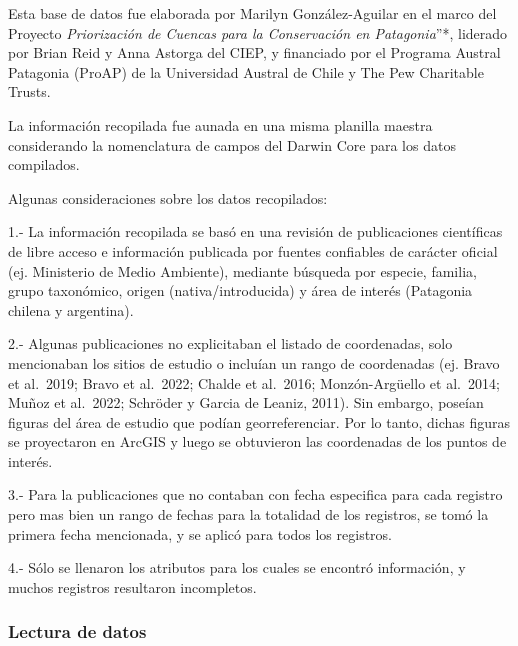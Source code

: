 \documentclass[sn-apa,pdflatex]{sn-jnl}
\begin{document}
Esta base de datos fue elaborada por Marilyn González-Aguilar en el
marco del Proyecto \emph{Priorización de Cuencas para la Conservación en
Patagonia}''*, liderado por Brian Reid y Anna Astorga del CIEP, y
financiado por el Programa Austral Patagonia (ProAP) de la Universidad
Austral de Chile y The Pew Charitable Trusts.

La información recopilada fue aunada en una misma planilla maestra
considerando la nomenclatura de campos del Darwin Core para los datos
compilados.

Algunas consideraciones sobre los datos recopilados:

1.- La información recopilada se basó en una revisión de publicaciones
científicas de libre acceso e información publicada por fuentes
confiables de carácter oficial (ej. Ministerio de Medio Ambiente),
mediante búsqueda por especie, familia, grupo taxonómico, origen
(nativa/introducida) y área de interés (Patagonia chilena y argentina).

2.- Algunas publicaciones no explicitaban el listado de coordenadas,
solo mencionaban los sitios de estudio o incluían un rango de
coordenadas (ej. Bravo et al.~2019; Bravo et al.~2022; Chalde et
al.~2016; Monzón-Argüello et al.~2014; Muñoz et al.~2022; Schröder y
Garcia de Leaniz, 2011). Sin embargo, poseían figuras del área de
estudio que podían georreferenciar. Por lo tanto, dichas figuras se
proyectaron en ArcGIS y luego se obtuvieron las coordenadas de los
puntos de interés.

3.- Para la publicaciones que no contaban con fecha especifica para cada
registro pero mas bien un rango de fechas para la totalidad de los
registros, se tomó la primera fecha mencionada, y se aplicó para todos
los registros.

4.- Sólo se llenaron los atributos para los cuales se encontró
información, y muchos registros resultaron incompletos.

\subsubsection{Lectura de datos}\label{lectura-de-datos-2}
\end{document}
